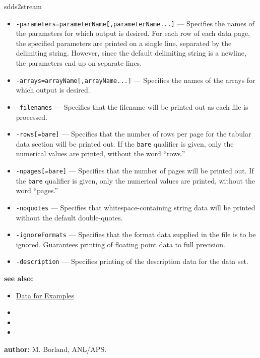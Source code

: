 \begin{sddsprog}{sdds2stream}
\begin{itemize}
      \item {\tt -parameters=parameterName[,parameterName...]} --- Specifies the names of the parameters for which output is desired. For each row of each data page, the specified parameters are printed on a single line, separated by the delimiting string. However, since the default delimiting string is a newline, the parameters end up on separate lines.
      \item {\tt -arrays=arrayName[,arrayName...]} --- Specifies the names of the arrays for which output is desired.
      \item {\tt -filenames} --- Specifies that the filename will be printed out as each file is processed.
      \item \verb|-rows[=bare]| --- Specifies that the number of rows per page for the tabular data section will be printed out. If the \verb|bare| qualifier is given, only the numerical values are printed, without the word ``rows.''
      \item \verb|-npages[=bare]| --- Specifies that the number of pages will be printed out. If the \verb|bare| qualifier is given, only the numerical values are printed, without the word ``pages.''
      \item \verb|-noquotes| --- Specifies that whitespace-containing string data will be printed without the default double-quotes.
      \item \verb|-ignoreFormats| --- Specifies that the format data supplied in the file is to be ignored. Guarantees printing of floating point data to full precision.
      \item \verb|-description| --- Specifies printing of the description data for the data set.
    \end{itemize}
  \item \textbf{see also:}
    \begin{itemize}
      \item \hyperref[exampleData]{Data for Examples}
      \item {}
      \item {}
      \item {}
    \end{itemize}
  \item \textbf{author:} M. Borland, ANL/APS.
\end{sddsprog}


